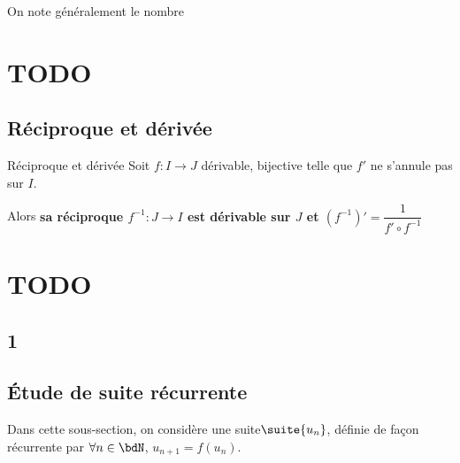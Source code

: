 \documentclass[a4paper,french,bookmarks]{article}
\begin{document}
On note généralement le nombre 

\section{TODO}
\subsection{Réciproque et dérivée}

\begin{theorem}{Réciproque et dérivée}{}
    Soit $f : I \to J$ dérivable, bijective telle que $f'$ ne s'annule pas sur $I$.
    
    Alors \bf{sa réciproque $f^{-1} : J \to I$ est dérivable sur $J$ et $\left(f^{-1}\right)' = \dfrac{1}{f' \circ f^{-1}}$}
\end{theorem}


\newpage

\section{TODO}

\subsection{1}
\subsection{Étude de suite récurrente}

Dans cette sous-section, on considère une suite$\suite{u_n}$, définie de façon récurrente par $\forall n \in \bdN$, $u_{n+1} = f(u_n)$.
\end{document}
